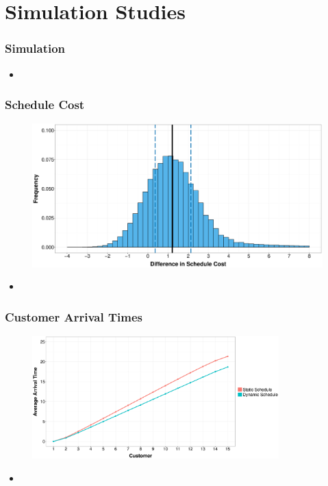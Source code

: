 \documentclass{beamer}
\begin{document}
\section{Simulation Studies}

\begin{frame}
	\frametitle{Simulation}

	\begin{itemize}
		\item 
	\end{itemize}
\end{frame}

\begin{frame}
	\frametitle{Schedule Cost}

	\begin{figure}
		\centering
		\includegraphics[width=\textwidth]{Cost_Hist_Diff.eps}
	\end{figure}

	\begin{itemize}
		\item 
	\end{itemize}
\end{frame}

\begin{frame}
	\frametitle{Customer Arrival Times}

	\begin{figure}
		\centering
		\includegraphics[width=0.85\textwidth]{AT_Line.eps}
	\end{figure}

	\begin{itemize}
		\item 
	\end{itemize}
\end{frame}
\end{document}
